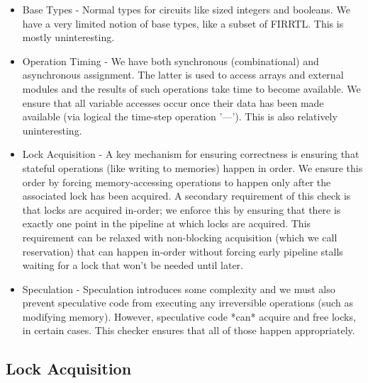 \documentclass{article}
\begin{document}
\begin{itemize}
\item Base Types - Normal types for circuits like sized integers and booleans.
  We have a very limited notion of base types, like a subset of FIRRTL. This is mostly
  uninteresting.
\item Operation Timing - We have both synchronous (combinational) and asynchronous
  assignment. The latter is used to access arrays and external modules and the results
  of such operations take time to become available. We ensure that all variable
  accesses occur once their data has been made available (via logical the time-step operation '---').
  This is also relatively uninteresting.
\item Lock Acquisition - A key mechanism for ensuring correctness is ensuring
  that stateful operations (like writing to memories) happen in order. We ensure
  this order by forcing memory-accessing operations to happen only after the associated
  lock has been acquired. A secondary requirement of this check is that locks are
  acquired in-order; we enforce this by ensuring that there is exactly one point
  in the pipeline at which locks are acquired. This requirement can be relaxed with
  non-blocking acquisition (which we call reservation) that can happen in-order without
  forcing early pipeline stalls waiting for a lock that won't be needed until later.
\item Speculation - Speculation introduces some complexity and we must also
  prevent speculative code from executing any irreversible operations (such as
  modifying memory). However, speculative code *can* acquire and free locks,
  in certain cases. This checker ensures that all of those happen appropriately.
\end{itemize}

\begin{figure}[h]
  \begin{syntax}
  \end{syntax}
\end{figure}

\subsection{Lock Acquisition}
\end{document}
